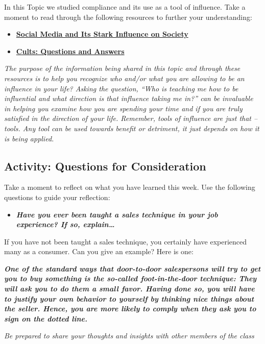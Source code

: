 \documentclass[
]{book}
\providecommand{\tightlist}{%
  \setlength{\itemsep}{0pt}\setlength{\parskip}{0pt}}
\begin{document}
\begin{reflect}
In this Topic we studied compliance and its use as a tool of influence. Take a moment to read through the following resources to further your understanding:

\begin{itemize}
\tightlist
\item
  \href{https://scholarworks.bgsu.edu/cgi/viewcontent.cgi?article=1004\&context=writ}{\textbf{Social Media and Its Stark Influence on Society }}\\
\item
  \href{https://cultrecovery101.com/cults-questions-and-answers/}{\textbf{Cults: Questions and Answers}}
\end{itemize}

\emph{The purpose of the information being shared in this topic and through these resources is to help you recognize who and/or what you are allowing to be an influence in your life? Asking the question, ``Who is teaching me how to be influential and what direction is that influence taking me in?'' can be invaluable in helping you examine how you are spending your time and if you are truly satisfied in the direction of your life. Remember, tools of influence are just that -- tools. Any tool can be used towards benefit or detriment, it just depends on how it is being applied.}
\end{reflect}

\hypertarget{activity-questions-for-consideration-9}{%
\subsection*{Activity: Questions for Consideration}\label{activity-questions-for-consideration-9}}

\begin{reflect}
Take a moment to reflect on what you have learned this week. Use the following questions to guide your reflection:

\begin{itemize}
\tightlist
\item
  \textbf{\emph{Have you ever been taught a sales technique in your job experience? If so, explain\ldots{}}}
\end{itemize}

If you have not been taught a sales technique, you certainly have experienced many as a consumer. Can you give an example? Here is one:

\textbf{\emph{One of the standard ways that door-to-door salespersons will try to get you to buy something is the so-called foot-in-the-door technique: They will ask you to do them a small favor. Having done so, you will have to justify your own behavior to yourself by think­ing nice things about the seller. Hence, you are more likely to comply when they ask you to sign on the dotted line.}}

\emph{Be prepared to share your thoughts and insights with other members of the class}
\end{reflect}
\end{document}
